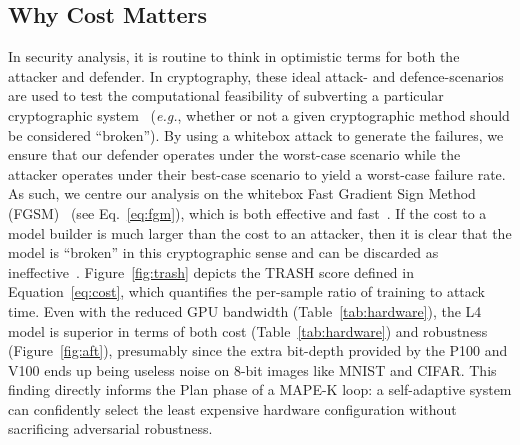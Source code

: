 \documentclass[conference]{IEEEtran}%
\begin{document}
\subsection{Why Cost Matters}

In security analysis, it is routine to think in optimistic terms for both the attacker and defender. 
In cryptography, these ideal attack- and defence-scenarios are used to test the computational feasibility of subverting a particular cryptographic system~\cite{kamal2017study,leurent2020sha} (\textit{e.g.}, whether or not a given cryptographic method should be considered ``broken'').
By using a whitebox attack to generate the failures, we ensure that our defender operates under the worst-case scenario while the attacker operates under their best-case scenario to yield a worst-case failure rate.
As such, we centre our analysis on the whitebox Fast Gradient Sign Method (FGSM)~\cite{fgm} (see Eq.~\ref{eq:fgm}), which is both effective and fast~\cite{meyers}.
If the cost to a model builder is much larger than the cost to an attacker, then it is clear that the model is ``broken'' in this cryptographic sense and can be discarded as ineffective~\cite{meyers_aft}.
Figure~\ref{fig:trash} depicts the TRASH score defined in Equation~\ref{eq:cost}, which quantifies the per-sample ratio of training to attack time.
Even with the reduced GPU bandwidth (Table~\ref{tab:hardware}), the L4 model is superior in terms of both cost (Table~\ref{tab:hardware}) and robustness (Figure~\ref{fig:aft}), presumably since the extra bit-depth provided by the P100 and V100 ends up being useless noise on 8-bit images like MNIST and CIFAR\@.
This finding directly informs the Plan phase of a MAPE-K loop: a self-adaptive system can confidently select the least expensive hardware configuration without sacrificing adversarial robustness.
\end{document}
